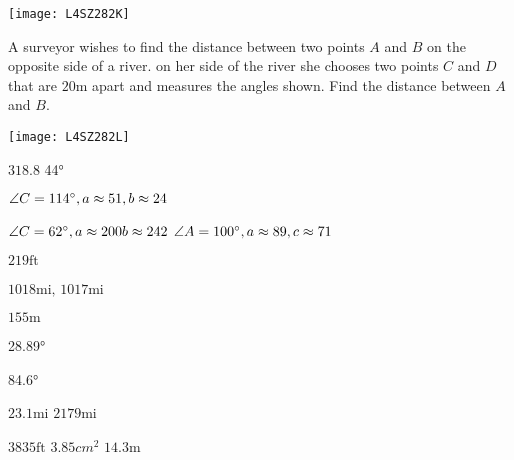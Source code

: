 \begin{Exercise}[title={Applications},label=exApplications]
\begin{multicols}{2}
	\texttt{[image: L4SZ282K]}	\\
\end{multicols}	

\begin{multicols}{2}
	\Question A surveyor wishes to find the distance between two points $A$ and $B$ on the opposite side of a river. on her side of the river she chooses two points $C$ and $D$ that are $20 \mbox{m}$ apart and measures the angles shown. Find	the distance between $A$ and $B\text{.}$%
	\columnbreak 
	
	\texttt{[image: L4SZ282L]}	\\
\end{multicols}	
\end{Exercise}%
\begin{Answer}[ref={exApplications}]

	\Question %
\begin{tasks}
	\task 	$318.8$ 
	\task 	\ang{44}
\end{tasks}
\Question %
$\angle C =114 \mbox{{\ensuremath{{}^\circ}}} ,a \approx 51 ,b \approx 24$
\Question %
\begin{tasks}
	\task 	$\angle C =62 \mbox{{\ensuremath{{}^\circ}}} ,a \approx 200 b \approx 242$
	\task 	$\angle A =100 \mbox{{\ensuremath{{}^\circ}}} ,a \approx 89 ,c \approx 71$
\end{tasks}
	\Question%
	$219 \mbox{ft}$

\Question %
\begin{tasks}
	\task $1018 \mbox{mi}\text{,}$
	\task $1017 \mbox{mi}$
\end{tasks}

	\Question %
	$155 \mbox{m}$
	
\Question %
\begin{tasks}
	\task 	\ang{28.89}
\end{tasks}
\Question %
\begin{tasks}
	\task 	\ang{84.6}
\end{tasks}
\Question %
$23.1 \mbox{mi}$
\Question %
$2179 \mbox{mi}$

	\Question %
	$3835 \mbox{ft}$ 
	\Question %
	$3.85 cm^{2}$
	\Question %
	$14.3 \mbox{m}$
	
\end{Answer}%


